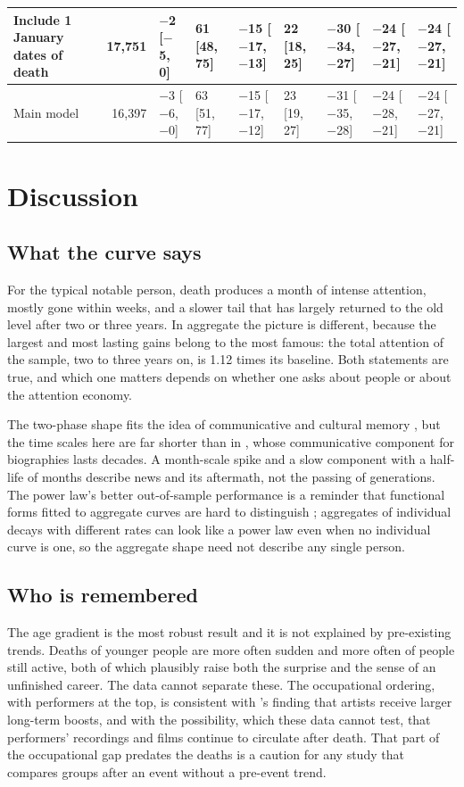\documentclass[11pt,a4paper]{article}
\begin{document}
\begin{table}[tbp]
{\begin{tabular}{p{4.4cm}rlllllll}
\quad Include 1 January dates of death & 17,751 & $-$2 [$-$5, 0] & 61 [48, 75] & $-$15 [$-$17, $-$13] & 22 [18, 25] & $-$30 [$-$34, $-$27] & $-$24 [$-$27, $-$21] & $-$24 [$-$27, $-$21]\\
\midrule Main model & 16,397 & $-$3 [$-$6, $-$0] & 63 [51, 77] & $-$15 [$-$17, $-$12] & 23 [19, 27] & $-$31 [$-$35, $-$28] & $-$24 [$-$28, $-$21] & $-$24 [$-$27, $-$21]\\
\bottomrule\end{tabular}}\end{table}

\section{Discussion}\label{sec:disc}
\subsection{What the curve says}
For the typical notable person, death produces a month of intense attention, mostly gone within weeks, and a slower tail that has largely returned to the old level after two or three years. In aggregate the picture is different, because the largest and most lasting gains belong to the most famous: the total attention of the sample, two to three years on, is 1.12 times its baseline. Both statements are true, and which one matters depends on whether one asks about people or about the attention economy.

The two-phase shape fits the idea of communicative and cultural memory \citep{assmann1995,candia2019}, but the time scales here are far shorter than in \citet{candia2019}, whose communicative component for biographies lasts decades. A month-scale spike and a slow component with a half-life of months describe news and its aftermath, not the passing of generations. The power law's better out-of-sample performance is a reminder that functional forms fitted to aggregate curves are hard to distinguish \citep{rubin1996}; aggregates of individual decays with different rates can look like a power law even when no individual curve is one, so the aggregate shape need not describe any single person.

\subsection{Who is remembered}
The age gradient is the most robust result and it is not explained by pre-existing trends. Deaths of younger people are more often sudden and more often of people still active, both of which plausibly raise both the surprise and the sense of an unfinished career. The data cannot separate these. The occupational ordering, with performers at the top, is consistent with \citet{west2021}'s finding that artists receive larger long-term boosts, and with the possibility, which these data cannot test, that performers' recordings and films continue to circulate after death. That part of the occupational gap predates the deaths is a caution for any study that compares groups after an event without a pre-event trend.
\end{document}
